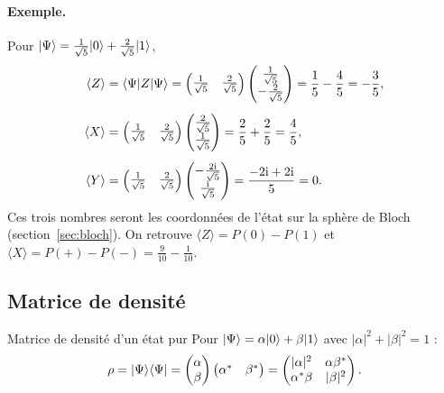 \paragraph{Exemple.} Pour $|\Psi\rangle=\frac{1}{\sqrt5}|0\rangle+\frac{2}{\sqrt5}|1\rangle$,
\begin{align*}
  \langle Z\rangle&=\langle \Psi|Z|\Psi\rangle
    =\begin{pmatrix}\frac{1}{\sqrt5} & \frac{2}{\sqrt5}\end{pmatrix}
     \begin{pmatrix}\frac{1}{\sqrt5}\\ -\frac{2}{\sqrt5}\end{pmatrix}=\frac15-\frac45=-\frac35,\\[1ex]
  \langle X\rangle&=\begin{pmatrix}\frac{1}{\sqrt5} & \frac{2}{\sqrt5}\end{pmatrix}
     \begin{pmatrix}\frac{2}{\sqrt5}\\ \frac{1}{\sqrt5}\end{pmatrix}=\frac25+\frac25=\frac45,\\[1ex]
  \langle Y\rangle&=\begin{pmatrix}\frac{1}{\sqrt5} & \frac{2}{\sqrt5}\end{pmatrix}
     \begin{pmatrix}-\frac{2\mathrm{i}}{\sqrt5}\\ \frac{\mathrm{i}}{\sqrt5}\end{pmatrix}=\frac{-2\mathrm{i}+2\mathrm{i}}{5}=0 .
\end{align*}
Ces trois nombres seront les coordonnées de l'état sur la sphère de Bloch (section~\ref{sec:bloch}).
On retrouve $\langle Z\rangle=P(0)-P(1)$ et $\langle X\rangle=P(+)-P(-)=\frac{9}{10}-\frac{1}{10}$.

\subsection{Matrice de densité}\label{sec:rho}

\begin{definition}{Matrice de densité d'un état pur}
Pour $|\Psi\rangle=\alpha|0\rangle+\beta|1\rangle$ avec $|\alpha|^2+|\beta|^2=1$ :
\[
  \rho=|\Psi\rangle\langle \Psi|
  =\begin{pmatrix}\alpha\\ \beta\end{pmatrix}\begin{pmatrix}\alpha^* & \beta^*\end{pmatrix}
  =\begin{pmatrix}|\alpha|^2 & \alpha\beta^*\\ \alpha^*\beta & |\beta|^2\end{pmatrix}.
\]
\end{definition}

